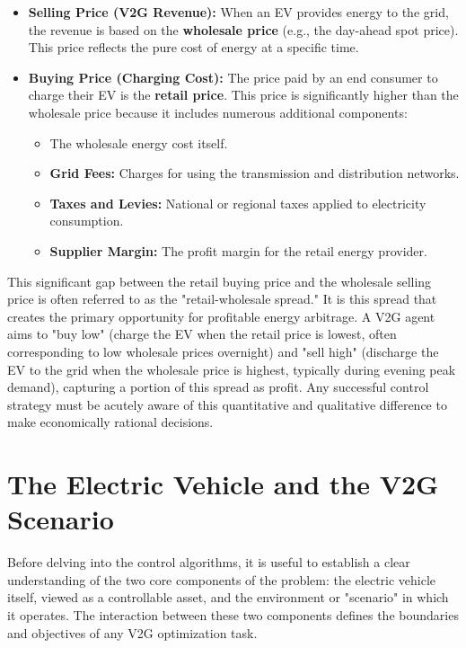 \begin{itemize}
    \item \textbf{Selling Price (V2G Revenue):} When an EV provides energy to the grid, the revenue is based on the \textbf{wholesale price} (e.g., the day-ahead spot price). This price reflects the pure cost of energy at a specific time.
    
    \item \textbf{Buying Price (Charging Cost):} The price paid by an end consumer to charge their EV is the \textbf{retail price}. This price is significantly higher than the wholesale price because it includes numerous additional components:
    \begin{itemize}
        \item The wholesale energy cost itself.
        \item \textbf{Grid Fees:} Charges for using the transmission and distribution networks.
        \item \textbf{Taxes and Levies:} National or regional taxes applied to electricity consumption.
        \item \textbf{Supplier Margin:} The profit margin for the retail energy provider.
    \end{itemize}
\end{itemize}
This significant gap between the retail buying price and the wholesale selling price is often referred to as the "retail-wholesale spread." It is this spread that creates the primary opportunity for profitable energy arbitrage. A V2G agent aims to "buy low" (charge the EV when the retail price is lowest, often corresponding to low wholesale prices overnight) and "sell high" (discharge the EV to the grid when the wholesale price is highest, typically during evening peak demand), capturing a portion of this spread as profit. Any successful control strategy must be acutely aware of this quantitative and qualitative difference to make economically rational decisions.

\section{The Electric Vehicle and the V2G Scenario}
\label{sec:ev_and_scenario}
Before delving into the control algorithms, it is useful to establish a clear understanding of the two core components of the problem: the electric vehicle itself, viewed as a controllable asset, and the environment or "scenario" in which it operates. The interaction between these two components defines the boundaries and objectives of any V2G optimization task.

